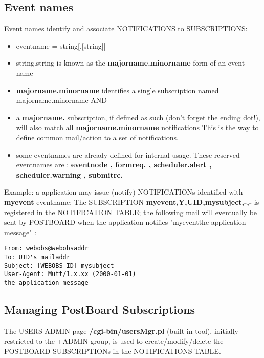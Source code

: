 \subsection{Event names}

Event names identify and associate NOTIFICATIONS to SUBSCRIPTIONS:  
\begin{itemize}
\item   eventname    = string[.[string]] 
\item   string.string is known as the \textbf{majorname.minorname} form of an event-name
\item   \textbf{majorname.minorname} identifies a single subscription named majorname.minorname AND  
\item   a \textbf{majorname.} subscription, if defined as such (don't forget the ending dot!), will also match all \textbf{majorname.minorname} notifications
This is the way to define common mail/action to a set of notifications.
\item   some eventnames are already defined for internal \webobs usage. These reserved eventnames are :
\textbf{eventnode , formreq. , scheduler.alert , scheduler.warning , submitrc. }
\end{itemize}

Example: a \webobs application may issue (notify) NOTIFICATIONs identified with \textbf{myevent} eventname;  
The SUBSCRIPTION \textbf{myevent,Y,UID,mysubject,-,-} is registered in the NOTIFICATION TABLE; the following mail will 
eventually be sent by POSTBOARD when the application notifies "myevent\textbar \textbar the application message" : 

\begin{lstlisting}[title=mail for myevent notification]
From: webobs@webobsaddr
To: UID's mailaddr
Subject: [WEBOBS_ID] mysubject
User-Agent: Mutt/1.x.xx (2000-01-01)
the application message 
\end{lstlisting}


\subsection{Managing PostBoard Subscriptions}

The USERS ADMIN page \textbf{/cgi-bin/usersMgr.pl} (built-in tool), initially restricted to the +ADMIN group, is used to create/modify/delete  
the POSTBOARD SUBSCRIPTIONs in the NOTIFICATIONS TABLE.

